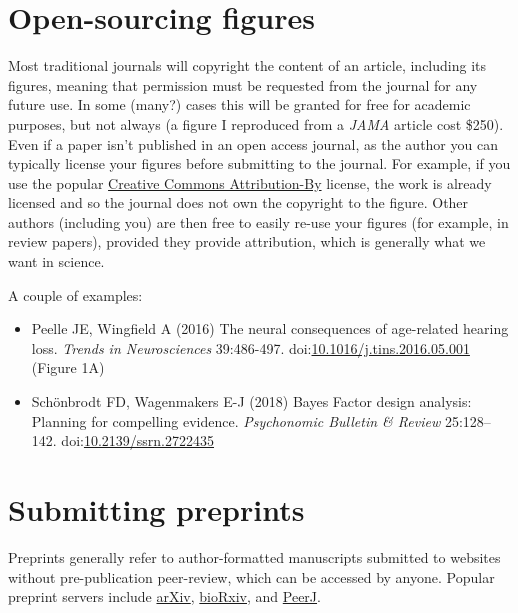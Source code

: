 \documentclass[letterpaper,oneside,11pt,article, portrait]{memoir}
\newcommand{\doi}[1]{doi:\href{http://dx.doi.org/#1}{#1}}
\newcommand{\journal}[1]{\textit{#1}} 			%
\begin{document}
\chapter{Open-sourcing figures} \label{CCFigure}

Most traditional journals will copyright the content of an article, including its figures, meaning that permission must be requested from the journal for any future use. In some (many?) cases this will be granted for free for academic purposes, but not always (a figure I reproduced from a \journal{JAMA} article cost \$250). Even if a paper isn't published in an open access journal, as the author you can typically license your figures before submitting to the journal. For example, if you use the popular \href{http://creativecommons.org/licenses/by/4.0/}{Creative Commons Attribution-By} license, the work is already licensed and so the journal does not own the copyright to the figure. Other authors (including you) are then free to easily re-use your figures (for example, in review papers), provided they provide attribution, which is generally what we want in science. 

A couple of examples:

\begin{itemize}

\item Peelle JE, Wingfield A (2016) The neural consequences of age-related hearing loss. \journal{Trends in Neurosciences} 39:486-497. \doi{10.1016/j.tins.2016.05.001} (Figure 1A)

\item Sch\"onbrodt FD, Wagenmakers E-J (2018) Bayes Factor design analysis: Planning for compelling evidence. \journal{Psychonomic Bulletin \& Review} 25:128--142. \doi{10.2139/ssrn.2722435}

\end{itemize}



\chapter{Submitting preprints} \label{preprint}

Preprints generally refer to author-formatted manuscripts submitted to websites without pre-publication peer-review, which can be accessed by anyone. Popular preprint servers include \href{http://arxiv.org}{arXiv},  \href{http://biorxiv.org}{bioRxiv}, and \href{http://peerj.com}{PeerJ}.
\end{document}
